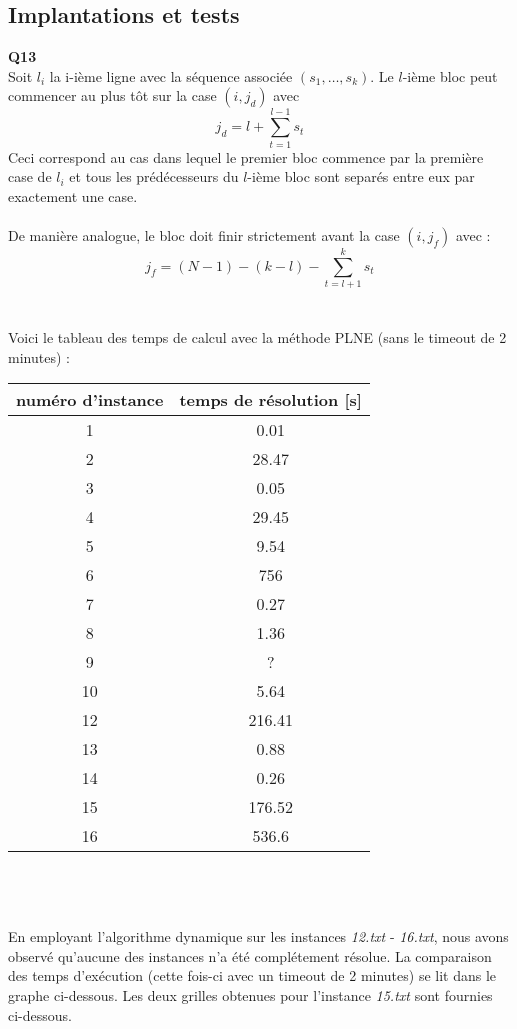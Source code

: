 \documentclass[10pt,a4paper]{article}
\begin{document}
\subsection{Implantations et tests}
\noindent
\textbf{Q13} \\ 
\noindent
Soit $l_i$ la i-ième ligne avec la séquence associée $(s_1, \hdots, s_k)$. Le $l$-ième bloc peut commencer au plus tôt sur la case $(i,j_d)$ avec $$j_d = l + \sum_{t = 1}^ {l-1} s_t$$
Ceci correspond au cas dans lequel le premier bloc commence par la première case de $l_i$ et tous les prédécesseurs du $l$-ième bloc sont separés entre eux par exactement une case. \\ \\
\noindent
De manière analogue, le bloc doit finir strictement avant la case $(i, j_f)$ avec : 
$$ j_f = (N-1) - (k-l) - \sum_{t = l+1}^k s_t$$
\\ \\
\noindent
Voici le tableau des temps de calcul avec la méthode PLNE (sans le timeout de 2 minutes) : \\
\begin{tabular}{|c|c|}
\hline
numéro d'instance & temps de résolution [s]\\
\hline
\hline
1  & 0.01\\
\hline
2 & 28.47\\
\hline
3 & 0.05\\
\hline
4 & 29.45\\
\hline
5 & 9.54\\
\hline
6 & 756\\
\hline
7 & 0.27\\
\hline
8 & 1.36\\
\hline
9 & ?\\
\hline
10 & 5.64\\
\hline
12 & 216.41\\
\hline
13 & 0.88\\
\hline
14 & 0.26\\
\hline
15 & 176.52\\
\hline
16 & 536.6\\ 
\hline

\end{tabular} 
\\ \\  \\
\noindent
En employant l'algorithme dynamique sur les instances \textit{12.txt} - \textit{16.txt}, nous avons observé qu'aucune des instances n'a été complétement résolue. La comparaison des temps d'exécution (cette fois-ci avec un timeout de 2 minutes) se lit dans le graphe ci-dessous. Les deux grilles obtenues pour l'instance \textit{15.txt} sont fournies ci-dessous. \\ 
\end{document}
